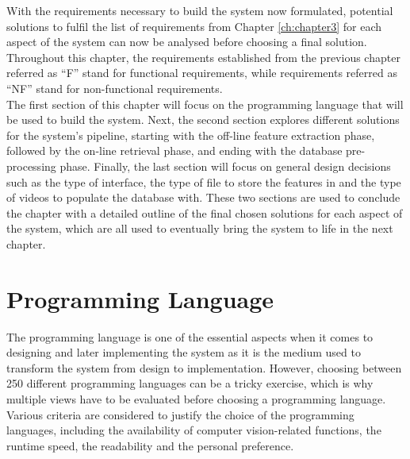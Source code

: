 With the requirements necessary to build the system now formulated, potential solutions to fulfil the list of requirements from Chapter \ref{ch:chapter3} for each aspect of the system can now be analysed before choosing a final solution.\\

Throughout this chapter, the requirements established from the previous chapter referred as ``F'' stand for functional requirements, while requirements referred as ``NF'' stand for non-functional requirements.\\

The first section of this chapter will focus on the programming language that will be used to build the system. Next, the second section explores different solutions for the system's pipeline, starting with the off-line feature extraction phase, followed by the on-line retrieval phase, and ending with the database pre-processing phase. Finally, the last section will focus on general design decisions such as the type of interface, the type of file to store the features in and the type of videos to populate the database with. These two sections are used to conclude the chapter with a detailed outline of the final chosen solutions for each aspect of the system, which are all used to eventually bring the system to life in the next chapter.


\section{Programming Language}
\label{sec:design-programming-languages}

The programming language is one of the essential aspects when it comes to designing and later implementing the system as it is the medium used to transform the system from design to implementation. However, choosing between 250 different programming languages \cite{tiobe} can be a tricky exercise, which is why multiple views have to be evaluated before choosing a programming language. Various criteria are considered to justify the choice of the programming languages, including the availability of computer vision-related functions, the runtime speed, the readability and the personal preference.\\

